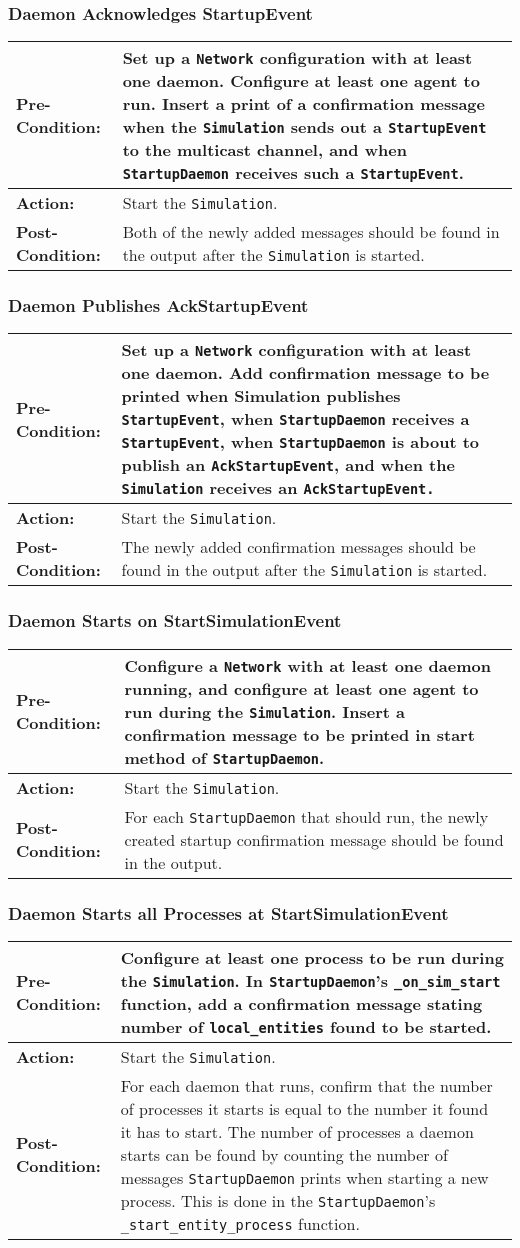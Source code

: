 \documentclass[titlepage]{article}
\newcommand{\testcase}[3]{
    \begin{center}
    \begin{tabular}{| l | p{0.7\textwidth}|}
        \hline
        \rowcolor[gray]{0.8}\textbf{Pre-Condition:} & #1 \\ \hline
        \textbf{Action:} & #2 \\ \hline
        \rowcolor[gray]{0.8}\textbf{Post-Condition:} & #3 \\ \hline
    \end{tabular}
    \end{center}
}
\begin{document}
\subsubsection{Daemon Acknowledges StartupEvent}
\testcase{Set up a \texttt{Network} configuration with at least one daemon.  Configure at least one agent to run.  Insert a print of a confirmation message when the \texttt{Simulation} sends out a \texttt{StartupEvent} to the multicast channel, and when \texttt{StartupDaemon} receives such a \texttt{StartupEvent}.}{Start the \texttt{Simulation}.}{Both of the newly added messages should be found in the output after the \texttt{Simulation} is started.}

\subsubsection{Daemon Publishes AckStartupEvent}
\testcase{Set up a \texttt{Network} configuration with at least one daemon.  Add confirmation message to be printed when Simulation publishes \texttt{StartupEvent}, when \texttt{StartupDaemon} receives a \texttt{StartupEvent}, when \texttt{StartupDaemon} is about to publish an \texttt{AckStartupEvent}, and when the \texttt{Simulation} receives an \texttt{AckStartupEvent.}}{Start the \texttt{Simulation}.}{The newly added confirmation messages should be found in the output after the \texttt{Simulation} is started.}

\subsubsection{Daemon Starts on StartSimulationEvent}
\testcase{Configure a \texttt{Network} with at least one daemon running, and configure at least one agent to run during the \texttt{Simulation}.  Insert a confirmation message to be printed in start method of \texttt{StartupDaemon}.}{Start the \texttt{Simulation}.}{For each \texttt{StartupDaemon} that should run, the newly created startup confirmation message should be found in the output.}

\subsubsection{Daemon Starts all Processes at StartSimulationEvent}
\testcase{Configure at least one process to be run during the \texttt{Simulation}.  In \texttt{StartupDaemon}'s \texttt{\_on\_sim\_start} function, add a confirmation message stating number of \texttt{local\_entities} found to be started.}{Start the \texttt{Simulation}.}{For each daemon that runs, confirm that the number of processes it starts is equal to the number it found it has to start.  The number of processes a daemon starts can be found by counting the number of messages \texttt{StartupDaemon} prints when starting a new process.  This is done in the \texttt{StartupDaemon}'s \texttt{\_start\_entity\_process} function.}
\end{document}
